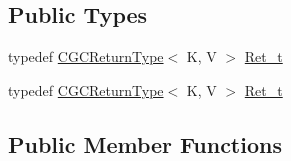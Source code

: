 \subsection*{Public Types}
\begin{DoxyCompactItemize}
\item 
typedef \mbox{\hyperlink{structHadron_1_1CGCReturnType}{C\+G\+C\+Return\+Type}}$<$ K, V $>$ \mbox{\hyperlink{classHadron_1_1CGCIntTarget_a3436ab6591c4722808ea25ced7b18c46}{Ret\+\_\+t}}
\item 
typedef \mbox{\hyperlink{structHadron_1_1CGCReturnType}{C\+G\+C\+Return\+Type}}$<$ K, V $>$ \mbox{\hyperlink{classHadron_1_1CGCIntTarget_a3436ab6591c4722808ea25ced7b18c46}{Ret\+\_\+t}}
\end{DoxyCompactItemize}
\subsection*{Public Member Functions}
